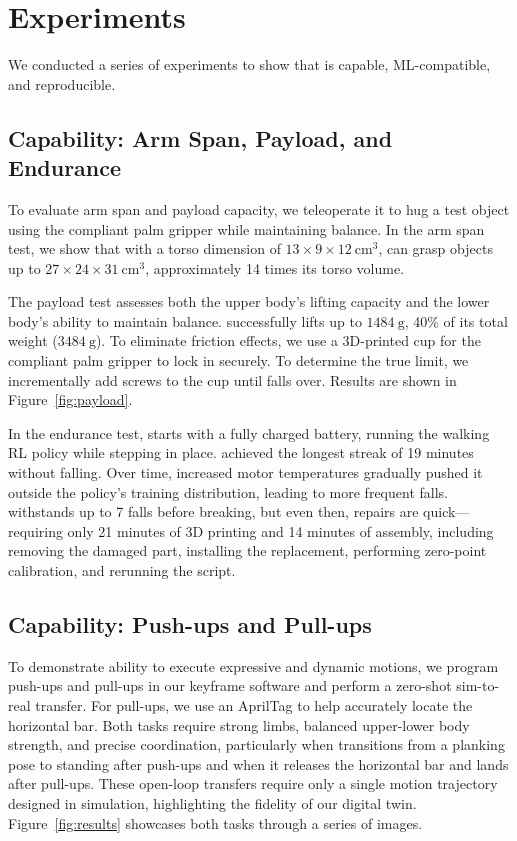 \section{Experiments}
\label{sec:experiments}

We conducted a series of experiments to show that \system is capable, ML-compatible, and reproducible.



\subsection{Capability: Arm Span, Payload, and Endurance}
To evaluate \systems arm span and payload capacity, we teleoperate it to hug a test object using the compliant palm gripper while maintaining balance. In the arm span test, we show that with a torso dimension of $13 \times 9 \times 12~\mathrm{cm}^3$, \system can grasp objects up to $27 \times 24 \times 31~\mathrm{cm}^3$, approximately 14 times its torso volume. 

The payload test assesses both the upper body’s lifting capacity and the lower body’s ability to maintain balance. \system successfully lifts up to $1484~\mathrm{g}$, 40\% of its total weight ($3484~\mathrm{g}$). 
To eliminate friction effects, we use a 3D-printed cup for the compliant palm gripper to lock in securely. To determine the true limit, we incrementally add screws to the cup until \system falls over. Results are shown in Figure~\ref{fig:payload}.

In the endurance test, \system starts with a fully charged battery, running the walking RL policy while stepping in place. \system achieved the longest streak of 19 minutes without falling. Over time, increased motor temperatures gradually pushed it outside the policy’s training distribution, leading to more frequent falls. \system withstands up to 7 falls before breaking, but even then, repairs are quick—requiring only 21 minutes of 3D printing and 14 minutes of assembly, including removing the damaged part, installing the replacement, performing zero-point calibration, and rerunning the script.


\subsection{Capability: Push-ups and Pull-ups}

To demonstrate \systems ability to execute expressive and dynamic motions, we program push-ups and pull-ups in our keyframe software and perform a zero-shot sim-to-real transfer. For pull-ups, we use an AprilTag to help \system accurately locate the horizontal bar. Both tasks require strong limbs, balanced upper-lower body strength, and precise coordination, particularly when \system transitions from a planking pose to standing after push-ups and when it releases the horizontal bar and lands after pull-ups. These open-loop transfers require only a single motion trajectory designed in simulation, highlighting the fidelity of our digital twin. Figure~\ref{fig:results} showcases both tasks through a series of images. 

